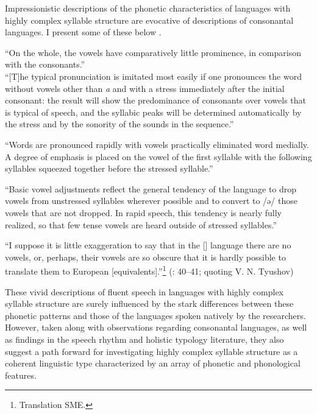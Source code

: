 Impressionistic descriptions of the phonetic characteristics of languages with highly complex syllable structure are evocative of descriptions of consonantal languages. I present some of these below .

\ea\label{ex:1.19}

“On the whole, the vowels have comparatively little prominence, in comparison with the consonants.”
\citep[24]{Kuipers1960}\medskip\\
“[T]he typical  pronunciation is imitated most easily if one pronounces the word without vowels other than \textit{a} and with a stress immediately after the initial consonant: the result will show the predominance of consonants over vowels that is typical of  speech, and the syllabic peaks will be determined automatically by the stress and by the sonority of the sounds in the sequence.” 
\citep[43]{Kuipers1960}
\z

\ea\label{ex:1.20}
“Words are pronounced rapidly with vowels practically eliminated word medially. A degree of emphasis is placed on the vowel of the first syllable with the following syllables squeezed together before the stressed syllable.” 
\citep[86--87]{Howard1967}
\z

\ea\label{ex:1.21}

“Basic vowel adjustments reflect the general tendency of the language to drop vowels from unstressed syllables wherever possible and to convert to /ə/ those vowels that are not dropped. In rapid speech, this tendency is nearly fully realized, so that few tense vowels are heard outside of stressed syllables.” 
\citep[31]{ThompsonThompson1992}
\z

\ea\label{ex:1.22}

“I suppose it is little exaggeration to say that in the [] language there are no vowels, or, perhaps, their vowels are so obscure that it is hardly possible to translate them to European [equivalents].”\footnote{{Translation SME.}} 
(\citealt{Volodin1976}: 40--41; quoting V. N. Tyushov)
\z

  These vivid descriptions of fluent speech in languages with highly complex syllable structure are surely influenced by the stark differences between these phonetic patterns and those of the languages spoken natively by the researchers. However, taken along with observations regarding consonantal languages, as well as findings in the speech rhythm and holistic typology literature, they also suggest a path forward for investigating highly complex syllable structure as a coherent linguistic type characterized by an array of phonetic and phonological features.

